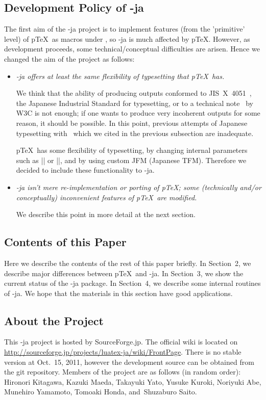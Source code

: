 \documentclass{ajt}
\begin{document}
\subsection{Development Policy of \LuaTeX-ja}
\label{ssec-pol} 
The first aim of the \LuaTeX-ja project is to implement features (from the
'primitive' level) of p\TeX\ as macros under \LuaTeX, so \LuaTeX-ja is
much affected by p\TeX.  However, as development proceeds, some
technical/conceptual difficulties are arisen. Hence we changed the aim
of the project as follows:
\begin{itemize}
\item\emph{\LuaTeX-ja offers at least the same flexibility of
     typesetting that p\TeX\ has.}

     We think that the ability of producing outputs conformed to
     JIS~X~4051~\cite{jisx4051}, the Japanese Industrial Standard for
     typesetting, or to a technical note~\cite{w3c} by W3C is not enough;
     if one wants to produce very incoherent outputs for some reason, it
     should be possible.
In this point, previous attempts of Japanese typesetting with \LuaTeX\
     which we cited in the previous subsection are inadequate.

p\TeX\ has some flexibility of typesetting, by changing internal
     parameters such as |\kanjiskip| or |\prebreakpenalty|, and by using
     custom JFM (Japanese TFM). Therefore we decided to include these
     functionality to \LuaTeX-ja.

\item\emph{\LuaTeX-ja isn't mere re-implementation or porting of p\TeX;
     some (technically and/or conceptually) inconvenient features of
     p\TeX\ are modified.} 

     We describe this point in more detail at the next section.
\end{itemize}


\subsection{Contents of this Paper}
Here we describe the contents of the rest of this paper briefly.  In
Section~2, we describe major differences between p\TeX\ and \LuaTeX-ja.
In Section~3, we show the current status of the \LuaTeX-ja package. In
Section~4, we describe some internal routines of \LuaTeX-ja.  We hope
that the materials in this section have good applications.

\subsection*{About the Project}
This \LuaTeX-ja project is hosted by SourceForge.jp. The official wiki
is located on
\url{http://sourceforge.jp/projects/luatex-ja/wiki/FrontPage}.  There is
no stable version at Oct.\ 15, 2011, however the development source can be
obtained from the git repository.  Members of the project are as follows
(in random order): Hironori Kitagawa, Kazuki Maeda, Takayuki Yato,
Yusuke Kuroki, Noriyuki Abe, Munehiro Yamamoto, Tomoaki Honda,
and~Shuzaburo Saito.
\end{document}
